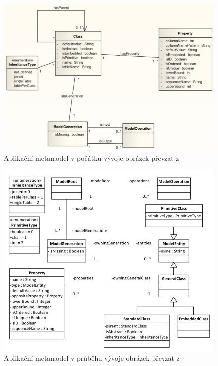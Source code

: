 \documentclass[11pt,twoside,a4paper]{book}
\begin{document}
\begin{figure}[h]
\begin{center}
\includegraphics[width=15cm]{figures/app_meta_BP}
\caption{Aplikační metamodel v počátku vývoje obrázek převzat z \cite{Lukes}}
\label{fig:lukes:app_meta}
\end{center}
\end{figure}
%
\begin{figure}[h]
\begin{center}
\includegraphics[width=15cm]{figures/app_meta_BP_jezek}
\caption{Aplikační metamodel v průběhu vývoje obrázek převzat z \cite{Jezek}}
\label{fig:jezek:app_meta}
\end{center}
\end{figure}
\FloatBarrier
\end{document}
